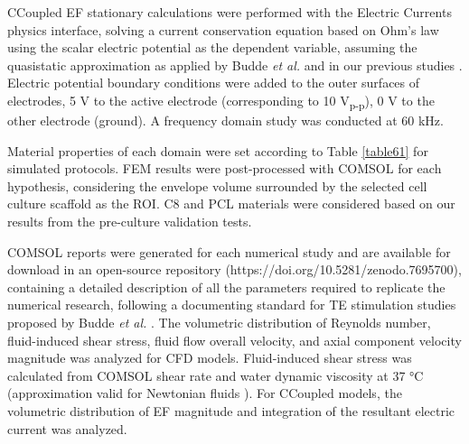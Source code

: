\acs{CCoupled} \acs{EF} stationary calculations were performed with the Electric Currents physics interface, solving a current conservation equation based on Ohm’s law using the scalar electric potential as the dependent variable, assuming the quasistatic approximation as applied by Budde \textit{et al.} \cite{Budde2019-qe} and in our previous studies \cite{Meneses2022-yk, Fernandes2022-lj}. Electric potential boundary conditions were added to the outer surfaces of electrodes, 5 \si{\volt} to the active electrode (corresponding to 10 \si{\volt}\textsubscript{p-p}), 0 \si{\volt} to the other electrode (ground). A frequency domain study was conducted at 60 \si{\kilo\hertz}.

Material properties of each domain were set according to Table \ref{table61} for simulated protocols. \ac{FEM} results were post-processed with COMSOL for each hypothesis, considering the envelope volume surrounded by the selected cell culture scaffold as the \acs{ROI}. C8 and PCL materials were considered based on our results from the pre-culture validation tests.

COMSOL reports were generated for each numerical study and are available for download in an open-source repository (https://doi.org/10.5281/zenodo.7695700), containing a detailed description of all the parameters required to replicate the numerical research, following a documenting standard for TE stimulation studies proposed by Budde \textit{et al.} \cite{Budde2019-qe}. The volumetric distribution of Reynolds number, fluid-induced shear stress, fluid flow overall velocity, and axial component velocity magnitude was analyzed for \acs{CFD} models. Fluid-induced shear stress was calculated from COMSOL shear rate and water dynamic viscosity at 37 \si{\celsius} (approximation valid for Newtonian fluids \cite{Wilson2018-ss}). For \acs{CCoupled} models, the volumetric distribution of \acs{EF} magnitude and integration of the resultant electric current was analyzed.


